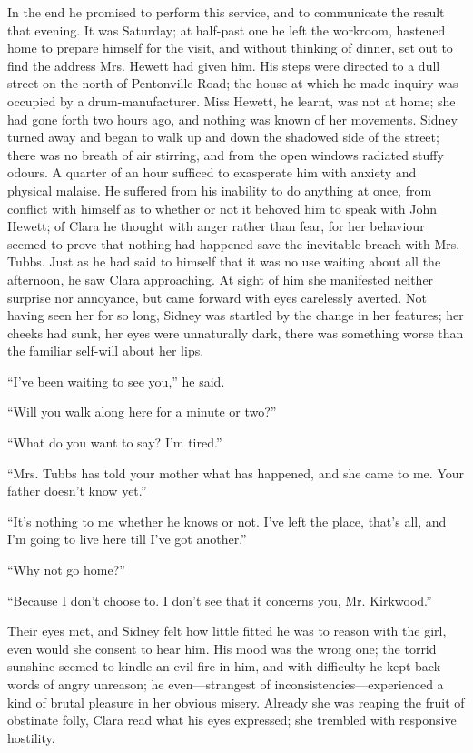 In the end he promised to perform this {}service, and to communicate the
result that evening. It was Saturday; at half-past one he left the
workroom, hastened home to prepare himself for the visit, and without
thinking of dinner, set out to find the address Mrs. Hewett had given
him. His steps were directed to a dull street on the north of
Pentonville Road; the house at which he made inquiry was occupied by a
drum-manufacturer. Miss Hewett, he learnt, was not at home; she had gone
forth two hours ago, and nothing was known of her movements. Sidney
turned away and began to walk up and down the shadowed side of the
street; there was no breath of air stirring, and from the open windows
radiated stuffy odours. A quarter of an hour sufficed to exasperate him
with anxiety and physical malaise. He suffered from his inability to do
anything at once, from conflict with himself as to whether or not it
behoved him to speak with John Hewett; of Clara he thought with anger
rather than fear, for her behaviour seemed to prove that nothing had
happened save the {}inevitable breach with Mrs. Tubbs. Just as he had
said to himself that it was no use waiting about all the afternoon, he
saw Clara approaching. At sight of him she manifested neither surprise
nor annoyance, but came forward with eyes carelessly averted. Not having
seen her for so long, Sidney was startled by the change in her features;
her cheeks had sunk, her eyes were unnaturally dark, there was something
worse than the familiar self-will about her lips.

``I've been waiting to see you,'' he said.

``Will you walk along here for a minute or two?''

``What do you want to say? I'm tired.''

``Mrs. Tubbs has told your mother what has happened, and she came to me.
Your father doesn't know yet.''

``It's nothing to me whether he knows or not. I've left the place,
that's all, and I'm going to live here till I've got another.''

``Why not go home?''

``Because I don't choose to. I don't see that it concerns you, Mr.
Kirkwood.''

{}Their eyes met, and Sidney felt how little fitted he was to reason
with the girl, even would she consent to hear him. His mood was the
wrong one; the torrid sunshine seemed to kindle an evil fire in him, and
with difficulty he kept back words of angry unreason; he
even---strangest of inconsistencies---experienced a kind of brutal
pleasure in her obvious misery. Already she was reaping the fruit of
obstinate folly, Clara read what his eyes expressed; she trembled with
responsive hostility.

